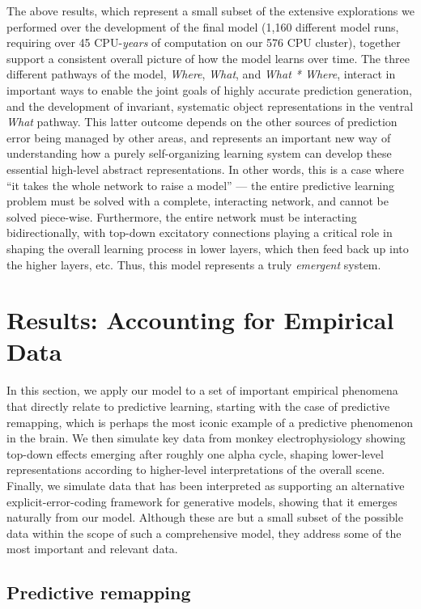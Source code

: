 \documentclass[11pt,twoside]{article}
\newif\myifpdf
\begin{document}
The above results, which represent a small subset of the extensive explorations we performed over the development of the final model (1,160 different model runs, requiring over 45 CPU-{\em years} of computation on our 576 CPU cluster), together support a consistent overall picture of how the model learns over time.  The three different pathways of the model, {\em Where}, {\em What}, and {\em What * Where}, interact in important ways to enable the joint goals of highly accurate prediction generation, and the development of invariant, systematic object representations in the ventral {\em What} pathway.  This latter outcome depends on the other sources of prediction error being managed by other areas, and represents an important new way of understanding how a purely self-organizing learning system can develop these essential high-level abstract representations.  In other words, this is a case where ``it takes the whole network to raise a model'' --- the entire predictive learning problem must be solved with a complete, interacting network, and cannot be solved piece-wise.  Furthermore, the entire network must be interacting bidirectionally, with top-down excitatory connections playing a critical role in shaping the overall learning process in lower layers, which then feed back up into the higher layers, etc.  Thus, this model represents a truly {\em emergent} system.

\section{Results: Accounting for Empirical Data}

In this section, we apply our model to a set of important empirical phenomena that directly relate to predictive learning, starting with the case of predictive remapping, which is perhaps the most iconic example of a predictive phenomenon in the brain.  We then simulate key data from monkey electrophysiology showing top-down effects emerging after roughly one alpha cycle, shaping lower-level representations according to higher-level interpretations of the overall scene.  Finally, we simulate data that has been interpreted as supporting an alternative explicit-error-coding framework for generative models, showing that it emerges naturally from our model.  Although these are but a small subset of the possible data within the scope of such a comprehensive model, they address some of the most important and relevant data.

\subsection{Predictive remapping}
\end{document}

